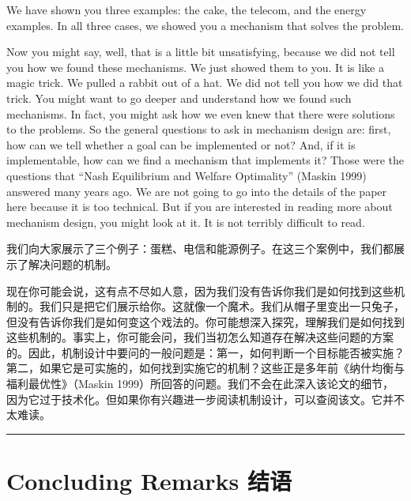 \documentclass[12pt,a4paper]{article}
\newenvironment{original}{%
  \par\vspace{4pt}\noindent%
  \color{black}%
  \ignorespaces
}{%
  \par\vspace{2pt}%
}
\newenvironment{translation}{%
  \par\vspace{2pt}\noindent%
  \color{transblue}%
  \ignorespaces
}{%
  \par\vspace{4pt}\hrule\vspace{6pt}%
}
\begin{document}
\begin{original}
We have shown you three examples: the cake, the telecom, and the energy examples. In all three cases, we showed you a mechanism that solves the problem.

Now you might say, well, that is a little bit unsatisfying, because we did not tell you how we found these mechanisms. We just showed them to you. It is like a magic trick. We pulled a rabbit out of a hat. We did not tell you how we did that trick. You might want to go deeper and understand how we found such mechanisms. In fact, you might ask how we even knew that there were solutions to the problems. So the general questions to ask in mechanism design are: first, how can we tell whether a goal can be implemented or not? And, if it is implementable, how can we find a mechanism that implements it? Those were the questions that ``Nash Equilibrium and Welfare Optimality'' (Maskin 1999) answered many years ago. We are not going to go into the details of the paper here because it is too technical. But if you are interested in reading more about mechanism design, you might look at it. It is not terribly difficult to read.
\end{original}
\begin{translation}
我们向大家展示了三个例子：蛋糕、电信和能源例子。在这三个案例中，我们都展示了解决问题的机制。

现在你可能会说，这有点不尽如人意，因为我们没有告诉你我们是如何找到这些机制的。我们只是把它们展示给你。这就像一个魔术。我们从帽子里变出一只兔子，但没有告诉你我们是如何变这个戏法的。你可能想深入探究，理解我们是如何找到这些机制的。事实上，你可能会问，我们当初怎么知道存在解决这些问题的方案的。因此，机制设计中要问的一般问题是：第一，如何判断一个目标能否被实施？第二，如果它是可实施的，如何找到实施它的机制？这些正是多年前《纳什均衡与福利最优性》（Maskin 1999）所回答的问题。我们不会在此深入该论文的细节，因为它过于技术化。但如果你有兴趣进一步阅读机制设计，可以查阅该文。它并不太难读。
\end{translation}

\section{Concluding Remarks \hfill 结语}
\end{document}
